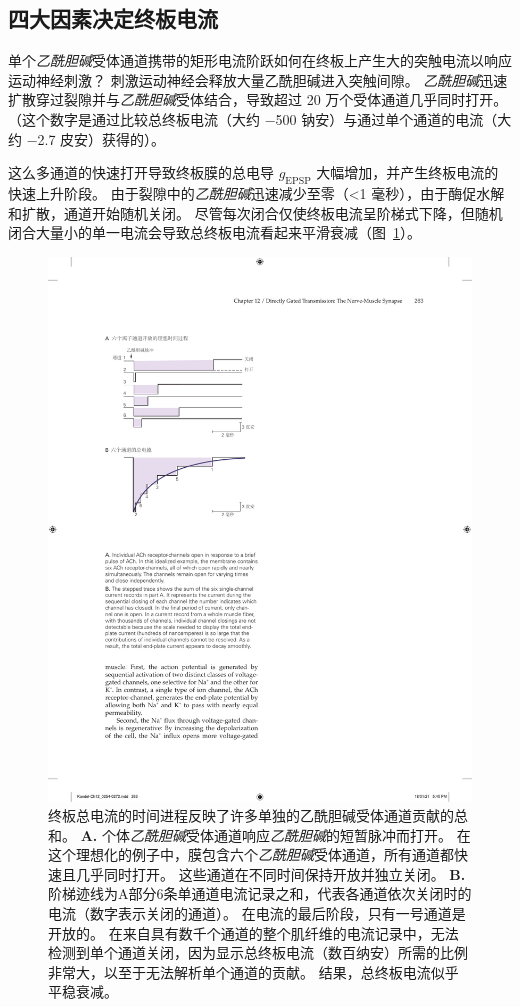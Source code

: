 \subsection{四大因素决定终板电流}

单个\textit{乙酰胆碱}受体通道携带的矩形电流阶跃如何在终板上产生大的突触电流以响应运动神经刺激？
刺激运动神经会释放大量乙酰胆碱进入突触间隙。
\textit{乙酰胆碱}迅速扩散穿过裂隙并与\textit{乙酰胆碱}受体结合，导致超过 20 万个受体通道几乎同时打开。
（这个数字是通过比较总终板电流（大约 −500 钠安）与通过单个通道的电流（大约 −2.7 皮安）获得的）。


这么多通道的快速打开导致终板膜的总电导 $ g_{\text{EPSP}} $ 大幅增加，并产生终板电流的快速上升阶段。
由于裂隙中的\textit{乙酰胆碱}迅速减少至零（<1 毫秒），由于酶促水解和扩散，通道开始随机关闭。
尽管每次闭合仅使终板电流呈阶梯式下降，但随机闭合大量小的单一电流会导致总终板电流看起来平滑衰减（图~\ref{fig:12_8}）。


\begin{figure}[htbp]
	\centering
	\includegraphics[width=0.65\linewidth]{chap12/fig_12_8}
	\caption{终板总电流的时间进程反映了许多单独的乙酰胆碱受体通道贡献的总和\cite{colquhoun1981fast}。
		\textbf{A.} 个体\textit{乙酰胆碱}受体通道响应\textit{乙酰胆碱}的短暂脉冲而打开。
		在这个理想化的例子中，膜包含六个\textit{乙酰胆碱}受体通道，所有通道都快速且几乎同时打开。
		这些通道在不同时间保持开放并独立关闭。
		\textbf{B.} 阶梯迹线为A部分6条单通道电流记录之和，代表各通道依次关闭时的电流（数字表示关闭的通道）。
		在电流的最后阶段，只有一号通道是开放的。
		在来自具有数千个通道的整个肌纤维的电流记录中，无法检测到单个通道关闭，因为显示总终板电流（数百纳安）所需的比例非常大，以至于无法解析单个通道的贡献。
		结果，总终板电流似乎平稳衰减。}
	\label{fig:12_8}
\end{figure}



